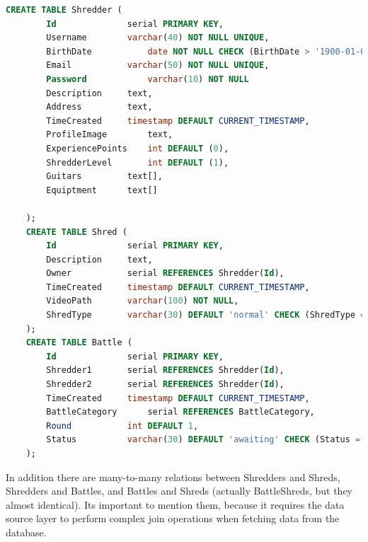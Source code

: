 \begin{lstlisting}[language=SQL]
	CREATE TABLE Shredder (
		Id				serial PRIMARY KEY, 
		Username		varchar(40) NOT NULL UNIQUE,
		BirthDate			date NOT NULL CHECK (BirthDate > '1900-01-01'),
		Email			varchar(50) NOT NULL UNIQUE,
		Password			varchar(10) NOT NULL
		Description		text,
		Address			text,
		TimeCreated		timestamp DEFAULT CURRENT_TIMESTAMP,
		ProfileImage		text,
		ExperiencePoints	int	DEFAULT (0),
		ShredderLevel		int DEFAULT (1),
		Guitars			text[],
		Equiptment		text[]
		
	);
	CREATE TABLE Shred (
		Id				serial PRIMARY KEY,
		Description		text,
		Owner			serial REFERENCES Shredder(Id),
		TimeCreated		timestamp DEFAULT CURRENT_TIMESTAMP,
		VideoPath		varchar(100) NOT NULL,
		ShredType		varchar(30) DEFAULT 'normal' CHECK (ShredType ='normal' or ShredType = 'battle')
	);	
	CREATE TABLE Battle (
		Id				serial PRIMARY KEY,
		Shredder1		serial REFERENCES Shredder(Id),
		Shredder2		serial REFERENCES Shredder(Id),
		TimeCreated		timestamp DEFAULT CURRENT_TIMESTAMP,
		BattleCategory		serial REFERENCES BattleCategory,
		Round			int DEFAULT 1,
		Status			varchar(30) DEFAULT 'awaiting' CHECK (Status ='accepted' or Status ='declined' or Status='awaiting');
	);	
\end{lstlisting}

In addition there are many-to-many relations between Shredders and Shreds, Shredders and Battles, and Battles and Shreds (actually BattleShreds, but they almost identical). Its important to mention them, because it requires the data source layer to perform complex join operations when fetching data from the database.


